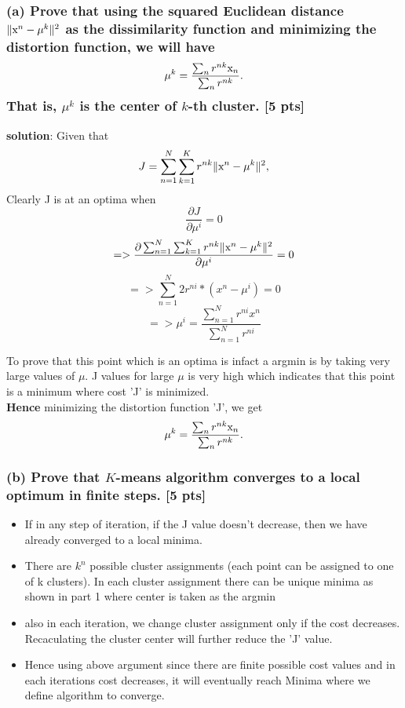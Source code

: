 \documentclass[twoside,10pt]{article}
\begin{document}
\subsubsection*{(a) Prove that using the squared Euclidean distance $\|\text x^n-\mu^k\|^2$ as the dissimilarity function and minimizing the distortion function, we will have 
   $$\mu^k=\frac{\sum_n r^{nk} \text x_n}{\sum_n r^{nk}}.$$
   That is, $\mu^k$ is the center of $k$-th cluster. [5 pts]}
\textbf{solution}: 
Given that 
$$J=\sum_{n=1}^N\sum_{k=1}^Kr^{nk} \|\text x^n-\mu^k\|^2,$$
Clearly J is at an optima when 
$$\frac{\partial J}{\partial \mu^i} = 0$$
$$=>\frac{\partial \sum_{n=1}^N\sum_{k=1}^Kr^{nk} \|\text x^n-\mu^k\|^2}{\partial \mu^i} = 0$$
$$=>\sum_{n=1}^N{2r^{ni}}*(x^n-\mu^i) = 0$$
$$=> \mu^i = \frac{\sum_{n=1}^N{r^{ni}x^n}}{\sum_{n=1}^N{r^{ni}}}$$

\hspace{1cm} To prove that this point which is an optima is infact a argmin is by taking very large values of $\mu$. J values for large $\mu$ is very high which indicates that this point is a minimum where cost 'J' is minimized.\\
\hspace{1cm} \textbf{Hence} minimizing the distortion function 'J', we get 
$$\mu^k=\frac{\sum_n r^{nk} \text x_n}{\sum_n r^{nk}}.$$
\subsubsection*{(b) Prove that $K$-means algorithm converges to a local optimum in finite steps. [5 pts]}
\begin{itemize}
\item If in any step of iteration, if the J value doesn't decrease, then we have already converged to a local minima.
\item There are $k^n$ possible cluster assignments (each point can be assigned to one of k clusters). In each cluster assignment there can be unique minima as shown in part 1 where center is taken as the argmin
\item also in each iteration, we change cluster assignment only if the cost decreases. Recaculating the cluster center will further reduce the 'J' value.
\item Hence using above argument since there are finite possible cost values and in each iterations cost decreases, it will eventually reach Minima where we define algorithm to converge.
\end{itemize}
\end{document}
